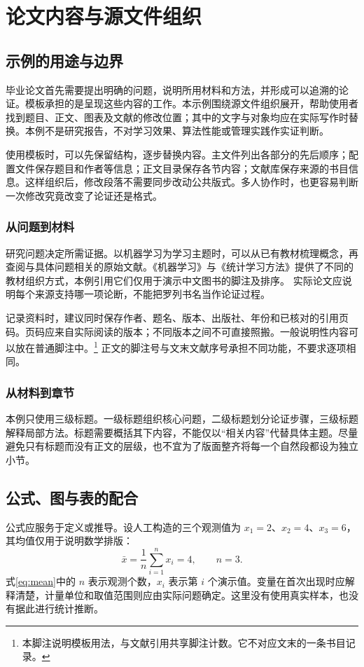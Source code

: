 \section{论文内容与源文件组织}
\label{sec:writing}

\subsection{示例的用途与边界}
毕业论文首先需要提出明确的问题，说明所用材料和方法，并形成可以追溯的论证。模板承担的是呈现这些内容的工作。本示例围绕源文件组织展开，帮助使用者找到题目、正文、图表及文献的修改位置；其中的文字与对象均应在实际写作时替换。本例不是研究报告，不对学习效果、算法性能或管理实践作实证判断。

使用模板时，可以先保留结构，逐步替换内容。主文件列出各部分的先后顺序；配置文件保存题目和作者等信息；正文目录保存各节内容；文献库保存来源的书目信息。这样组织后，修改段落不需要同步改动公共版式。多人协作时，也更容易判断一次修改究竟改变了论证还是格式。

\subsubsection{从问题到材料}
研究问题决定所需证据。以机器学习为学习主题时，可以从已有教材梳理概念，再查阅与具体问题相关的原始文献。《机器学习》与《统计学习方法》提供了不同的教材组织方式，本例引用它们仅用于演示中文图书的脚注及排序。 实际论文应说明每个来源支持哪一项论断，不能把罗列书名当作论证过程。

记录资料时，建议同时保存作者、题名、版本、出版社、年份和已核对的引用页码。页码应来自实际阅读的版本；不同版本之间不可直接照搬。一般说明性内容可以放在普通脚注中。\footnote{本脚注说明模板用法，与文献引用共享脚注计数。它不对应文末的一条书目记录。} 正文的脚注号与文末文献序号承担不同功能，不要求逐项相同。

\subsubsection{从材料到章节}
本例只使用三级标题。一级标题组织核心问题，二级标题划分论证步骤，三级标题解释局部方法。标题需要概括其下内容，不能仅以“相关内容”代替具体主题。尽量避免只有标题而没有正文的层级，也不宜为了版面整齐将每一个自然段都设为独立小节。

\subsection{公式、图与表的配合}
\label{sec:objects}
公式应服务于定义或推导。设人工构造的三个观测值为 $x_1=2$、$x_2=4$、$x_3=6$，其均值仅用于说明数学排版：
\begin{equation}
  \bar{x}=\frac{1}{n}\sum_{i=1}^{n}x_i=4,\qquad n=3.
  \label{eq:mean}
\end{equation}
式\eqref{eq:mean}中的 $n$ 表示观测个数，$x_i$ 表示第 $i$ 个演示值。变量在首次出现时应解释清楚，计量单位和取值范围则应由实际问题确定。这里没有使用真实样本，也没有据此进行统计推断。

